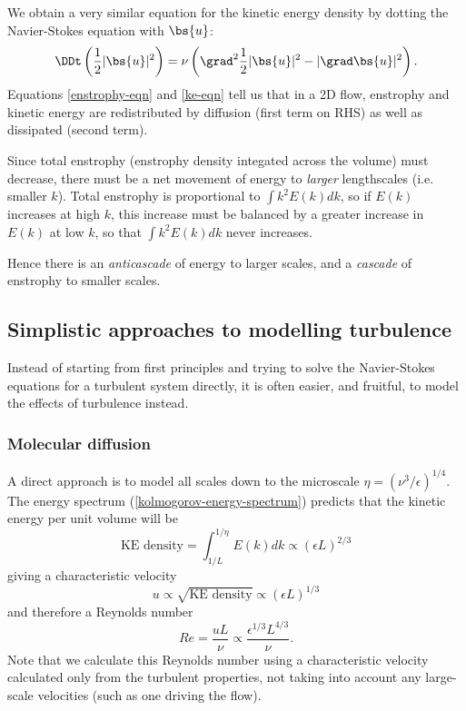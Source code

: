 We obtain a very similar equation for the kinetic energy density by dotting the
Navier-Stokes equation with $\bs{u}$:
\begin{equation}
    \DDt\left(\frac{1}{2}|\bs{u}|^2\right) 
    = \nu\left(\grad^2\frac{1}{2}|\bs{u}|^2 - |\grad\bs{u}|^2\right).
 \label{ke-eqn}
\end{equation}
Equations \ref{enstrophy-eqn} and \ref{ke-eqn} tell us that in a 2D flow,
enstrophy and kinetic energy are redistributed by diffusion (first term on RHS)
as well as dissipated (second term).

Since total enstrophy (enstrophy density integated across the volume) must
decrease, there must be a net movement of energy to \textit{larger} lengthscales
(i.e.  smaller $k$). Total enstrophy is proportional to $\int k^2E(k) dk$, so if
$E(k)$ increases at high $k$, this increase must be balanced by a greater
increase in $E(k)$ at low $k$, so that $\int k^2E(k) dk$ never increases.

Hence there is an \textit{anticascade} of energy to larger scales, and a
\textit{cascade} of enstrophy to smaller scales.

\subsection{Simplistic approaches to modelling turbulence}

Instead of starting from first principles and trying to solve the Navier-Stokes
equations for a turbulent system directly, it is often easier, and fruitful, to
model the effects of turbulence instead.

\subsubsection{Molecular diffusion}

A direct approach is to model all scales down to the microscale
$\eta=(\nu^3/\epsilon)^{1/4}$. The energy spectrum
(\ref{kolmogorov-energy-spectrum}) predicts that the kinetic energy 
per unit volume will be 
\begin{equation}
    \text{KE density} = \int_{1/L}^{1/\eta} E(k) dk \propto (\epsilon L)^{2/3}
\end{equation}
giving a characteristic velocity
\begin{equation}
    u \propto \sqrt{\text{KE density}} \propto (\epsilon L)^{1/3}
\end{equation}
and therefore a Reynolds number
\begin{equation}
    Re = \frac{uL}{\nu} \propto \frac{\epsilon^{1/3} L^{4/3}}{\nu}.
\end{equation}
Note that we calculate this Reynolds number using a characteristic velocity
calculated only from the turbulent properties, not taking into account any
large-scale velocities (such as one driving the flow). 

